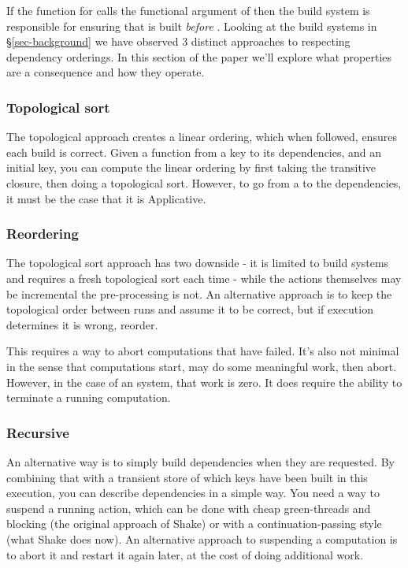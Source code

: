 If the  function for  calls the functional argument of  then the build system is responsible for ensuring that  is built \textit{before} . Looking at the build systems in \S\ref{sec-background} we have observed 3 distinct approaches to respecting dependency orderings. In this section of the paper we'll explore what properties are a consequence and how they operate.

\subsubsection{Topological sort}

The topological approach creates a linear ordering, which when followed, ensures each build is correct. Given a function from a key to its dependencies, and an initial key, you can compute the linear ordering by first taking the transitive closure, then doing a topological sort. However, to go from a  to the dependencies, it must be the case that it is Applicative.


\subsubsection{Reordering}

The topological sort approach has two downside - it is limited to  build systems and requires a fresh topological sort each time - while the actions themselves may be incremental the pre-processing is not. An alternative approach is to keep the topological order between runs and assume it to be correct, but if execution determines it is wrong, reorder.

This requires a way to abort computations that have failed. It's also not minimal in the sense that computations start, may do some meaningful work, then abort. However, in the case of an  system, that work is zero. It does require the ability to terminate a running computation.

\subsubsection{Recursive}

An alternative way is to simply build dependencies when they are requested. By combining that with a transient store of which keys have been built in this execution, you can describe dependencies in a simple way. You need a way to suspend a running action, which can be done with cheap green-threads and blocking (the original approach of Shake) or with a continuation-passing style (what Shake does now). An alternative approach to suspending a computation is to abort it and restart it again later, at the cost of doing additional work.


